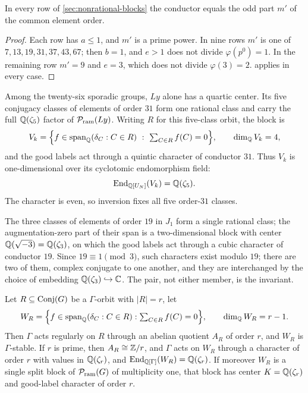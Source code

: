 \begin{corollary}
\label{cor:conductor-odd-part}
In every row of \cref{sec:nonrational-blocks} the conductor equals the odd
part \(m'\) of the common element order.
\end{corollary}

\begin{proof}
Each row has \(a\leq1\), and \(m'\) is a prime power.  In nine rows \(m'\) is
one of \(7,13,19,31,37,43,67\); then \(b=1\), and \(e>1\) does not divide
\(\varphi(p^0)=1\).  In the remaining row \(m'=9\) and \(e=3\), which does
not divide \(\varphi(3)=2\).
 applies in every case.
\end{proof}

\begin{example}
\label{ex:ly-quintic}
Among the twenty-six sporadic groups, \(Ly\) alone has a quartic center.
Its five conjugacy classes of elements of order \(31\) form one rational
class and carry the full \(\mathbb Q(\zeta_5)\) factor of \(\mathcal P_{\mathrm{ram}}(Ly)\).  Writing
\(R\) for this five-class orbit, the block is
\[
 V_k=\Bigl\{f\in\Span_\Q(\delta_C:C\in R)\ :\ \textstyle\sum_{C\in R}f(C)=0\Bigr\},
 \qquad \dim_\Q V_k=4,
\]
and the good labels act through a quintic character of conductor \(31\).
Thus \(V_k\) is one-dimensional over its cyclotomic endomorphism field:
\[
 \operatorname{End}_{\mathbb Q[U_N]}(V_k)=\mathbb Q(\zeta_5).
\]
The character is even, so inversion fixes all five order-\(31\) classes.
\end{example}

\begin{example}
\label{ex:j1-cubic}
The three classes of elements of order \(19\) in \(J_1\) form a single
rational class; the augmentation-zero part of their span is a two-dimensional
block with center \(\mathbb Q(\sqrt{-3})=\mathbb Q(\zeta_3)\), on which the good labels act
through a cubic character of conductor \(19\).  Since \(19\equiv1\pmod3\),
such characters exist modulo \(19\); there are two of them, complex conjugate
to one another, and they are interchanged by the choice of embedding
\(\mathbb Q(\zeta_3)\hookrightarrow\mathbb C\).  The pair, not either member, is the
invariant.
\end{example}

\begin{theorem}
\label{thm:regular-rational-class}
Let \(R\subseteq\operatorname{Conj}(G)\) be a \(\Gamma\)-orbit with \(|R|=r\), let
\[
 W_R=\Bigl\{f\in\operatorname{span}_\mathbb Q(\delta_C:C\in R):\textstyle\sum_{C\in R}f(C)=0\Bigr\},
 \qquad \dim_\mathbb Q W_R=r-1 .
\]
Then \(\Gamma\) acts regularly on \(R\) through an abelian quotient
\(A_R\) of order \(r\), and \(W_R\) is \(\Gamma\)-stable.  If \(r\) is
prime, then \(A_R\cong\mathbb Z/r\), and \(\Gamma\) acts on \(W_R\) through a
character of order \(r\) with values in \(\mathbb Q(\zeta_r)\), and
\(\operatorname{End}_{\mathbb Q[\Gamma]}(W_R)=\mathbb Q(\zeta_r)\).  If moreover \(W_R\) is a single
split block of \(\mathcal P_{\mathrm{ram}}(G)\) of multiplicity one, that block has center
\(K=\mathbb Q(\zeta_r)\) and good-label character of order \(r\).
\end{theorem}

